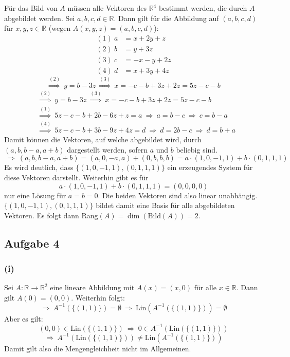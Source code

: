 \documentclass[10pt, a4paper]{article}
\begin{document}
		Für das Bild von $A$ müssen alle Vektoren des $\mathbb{R}^4$ bestimmt werden, die durch $A$ abgebildet werden. Sei $a,b,c,d \in \mathbb{R}$. Dann gilt für die Abbildung auf $(a,b,c,d)$ für $x,y,z \in \mathbb{R}$ (wegen $A(x,y,z) = (a,b,c,d)$):
		\begin{align*}
			(1) \ a &= x+2y+z\\
			(2) \ b &= y+3z\\
			(3) \ c &= -x-y+2z\\
			(4) \ d &= x+3y+4z
		\end{align*}
		\[
			\stackrel{(2)}{\Rightarrow} \ y = b-3z \ \stackrel{(3)}{\Rightarrow} \ x = -c-b+3z+2z = 5z-c-b
		\]
		\begin{align*}
			&\stackrel{(2)}{\Rightarrow} \ y = b-3z \ \stackrel{(3)}{\Rightarrow} \ x = -c-b+3z+2z = 5z-c-b \\
			&\stackrel{(1)}{\Rightarrow} \ 5z-c-b+2b-6z+z = a \ \Rightarrow \ a = b-c \ \Rightarrow \ c = b-a \\
			&\stackrel{(4)}{\Rightarrow} \ 5z-c-b+3b-9z+4z=d \ \Rightarrow \ d = 2b-c \ \Rightarrow \ d = b+a
		\end{align*}
		Damit können die Vektoren, auf welche abgebildet wird, durch $(a,b,b-a,a+b)$ dargestellt werden, sofern $a$ und $b$ beliebig sind.
		\[
			\ \Rightarrow \ (a,b,b-a,a+b) = (a,0,-a,a) + (0,b,b,b) = a\cdot(1,0,-1,1) + b\cdot(0,1,1,1)
		\]
		Es wird deutlich, dass $\{(1,0,-1,1),(0,1,1,1)\}$ ein erzeugendes System für diese Vektoren darstellt. Weiterhin gibt es für
		\[
			a\cdot(1,0,-1,1) + b\cdot(0,1,1,1) = (0,0,0,0)
		\]
		nur eine Lösung für $a=b=0$. Die beiden Vektoren sind also linear unabhängig. $\{(1,0,-1,1),(0,1,1,1)\}$ bildet damit eine Basis für alle abgebildeten Vektoren. Es folgt dann Rang$(A)=\dim(\text{Bild}(A))=2$.


	\newpage

	\subsection*{Aufgabe 4} %
	\label{sub:aufgabe_4}
	
		\subsubsection*{(i)} %
		\label{ssub:i}
		
			Sei $A:\mathbb{R}\longrightarrow\mathbb{R}^2$ eine lineare Abbildung mit $A(x)=(x,0)$ für alle $x \in \mathbb{R}$.
			Dann gilt $A(0)=(0,0)$. Weiterhin folgt:
			\[
				\Rightarrow \ A^{-1}(\{(1,1)\}) = \emptyset \ \Rightarrow \ \text{Lin}(A^{-1}(\{(1,1)\})) = \emptyset
			\]
			Aber es gilt:
			\[
				(0,0)\in \text{Lin}(\{(1,1)\}) \ \Rightarrow \ 0 \in A^{-1}(\text{Lin}(\{(1,1)\}))
			\]
			\[
				\Rightarrow \ A^{-1}(\text{Lin}(\{(1,1)\})) \neq \text{Lin}(A^{-1}(\{(1,1)\}))
			\]
			Damit gilt also die Mengengleichheit nicht im Allgemeinen.
\end{document}
